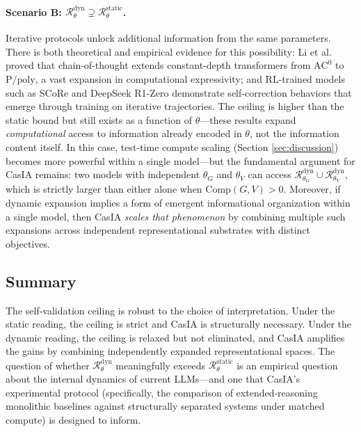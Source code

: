 \documentclass[11pt,a4paper]{article}
\theoremstyle{remark}
\begin{document}
\paragraph{Scenario B: $\mathcal{R}_\theta^{\mathrm{dyn}} \supsetneq \mathcal{R}_\theta^{\mathrm{static}}$.} Iterative protocols unlock additional information from the same parameters. There is both theoretical and empirical evidence for this possibility: Li et al. \cite{li2024cot} proved that chain-of-thought extends constant-depth transformers from $\mathrm{AC}^0$ to $\mathrm{P/poly}$, a vast expansion in computational expressivity; and RL-trained models such as SCoRe \cite{kumar2025score} and DeepSeek R1-Zero \cite{deepseek2025r1} demonstrate self-correction behaviors that emerge through training on iterative trajectories. The ceiling is higher than the static bound but still exists as a function of $\theta$---these results expand \emph{computational} access to information already encoded in $\theta$, not the information content itself. In this case, test-time compute scaling (Section \ref{sec:discussion}) becomes more powerful within a single model---but the fundamental argument for CasIA remains: two models with independent $\theta_G$ and $\theta_V$ can access $\mathcal{R}_{\theta_G}^{\mathrm{dyn}} \cup \mathcal{R}_{\theta_V}^{\mathrm{dyn}}$, which is strictly larger than either alone when $\mathrm{Comp}(G, V) > 0$. Moreover, if dynamic expansion implies a form of emergent informational organization within a single model, then CasIA \emph{scales that phenomenon} by combining multiple such expansions across independent representational substrates with distinct objectives.

\subsection{Summary}

The self-validation ceiling is robust to the choice of interpretation. Under the static reading, the ceiling is strict and CasIA is structurally necessary. Under the dynamic reading, the ceiling is relaxed but not eliminated, and CasIA amplifies the gains by combining independently expanded representational spaces. The question of whether $\mathcal{R}_\theta^{\mathrm{dyn}}$ meaningfully exceeds $\mathcal{R}_\theta^{\mathrm{static}}$ is an empirical question about the internal dynamics of current LLMs---and one that CasIA's experimental protocol (specifically, the comparison of extended-reasoning monolithic baselines against structurally separated systems under matched compute) is designed to inform.
\end{document}
